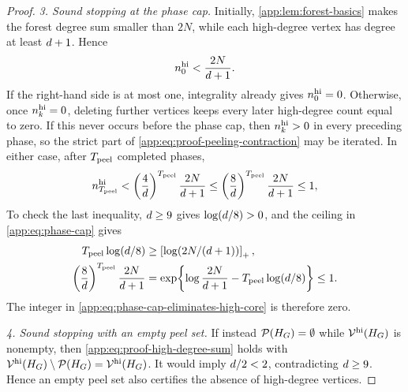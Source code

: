 \begin{proof}
\emph{3. Sound stopping at the phase cap.}
Initially, \cref{app:lem:forest-basics} makes the forest degree sum smaller
than $2N$, while each high-degree vertex has degree at least
$d+1$.  Hence
\begin{equation}
 n_{0}^{\mathrm{hi}}<\frac{2N}{d+1}.
 \label{app:eq:initial-high-count}
\end{equation}
If the right-hand side is at most one, integrality already gives
$n_{0}^{\mathrm{hi}}=0$.
Otherwise, once $n_{k}^{\mathrm{hi}}=0$, deleting further vertices keeps every
later high-degree count equal to zero.  If this never occurs before the phase
cap, then $n_{k}^{\mathrm{hi}}>0$ in every preceding phase, so the strict part
of \eqref{app:eq:proof-peeling-contraction} may be iterated.  In either case,
after $T_{\mathrm{peel}}$ completed phases,
\begin{equation}
 n_{T_{\mathrm{peel}}}^{\mathrm{hi}}
 <\left(\frac4{d}\right)^{T_{\mathrm{peel}}}
   \frac{2N}{d+1}
 \le
 \left(\frac8{d}\right)^{T_{\mathrm{peel}}}
   \frac{2N}{d+1}
 \le1,
 \label{app:eq:phase-cap-eliminates-high-core}
\end{equation}
To check the last inequality, $d\ge9$ gives
$\log(d/8)>0$, and the ceiling in
\eqref{app:eq:phase-cap} gives
\begin{align*}
 T_{\mathrm{peel}}\log(d/8)
 &\ge \left[\log(2N/(d+1))\right]_+,\\
 \left(\frac8{d}\right)^{T_{\mathrm{peel}}}
       \frac{2N}{d+1}
 &=\exp\!\left\{\log\frac{2N}{d+1}
                -T_{\mathrm{peel}}\log(d/8)\right\}\le1.
\end{align*}
The integer in \eqref{app:eq:phase-cap-eliminates-high-core} is therefore zero.

\emph{4. Sound stopping with an empty peel set.}
If instead $\mathcal P(H_{G})=\emptyset$ while $\mathcal V^{\mathrm{hi}}(H_{G})$ is nonempty, then
\eqref{app:eq:proof-high-degree-sum} holds with
$\mathcal V^{\mathrm{hi}}(H_{G})\setminus\mathcal P(H_{G})=\mathcal V^{\mathrm{hi}}(H_{G})$.  It would imply
$d/2<2$, contradicting $d\ge9$.  Hence an empty peel
set also certifies the absence of high-degree vertices.


\end{proof}
